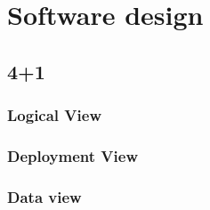 \chapter{Software design}

\section{4+1}

\subsection{Logical View}


\clearpage

\subsection{Deployment View}


\clearpage

\subsection{Data view}

